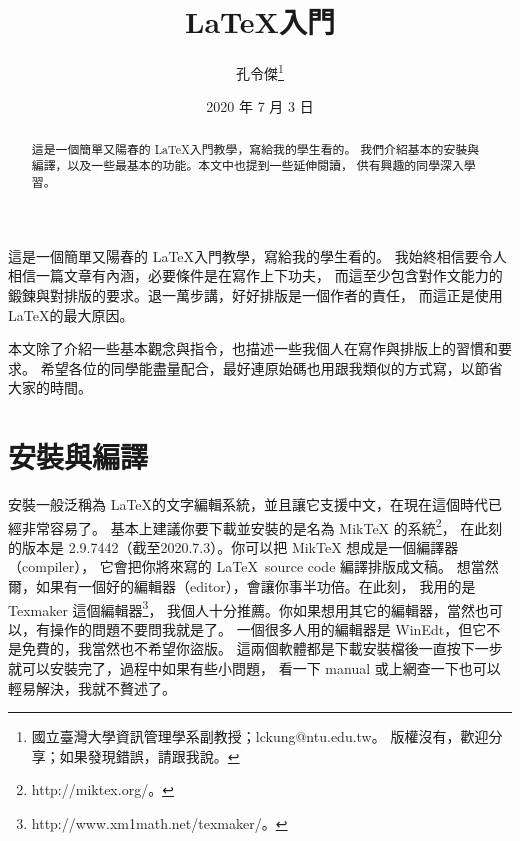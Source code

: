 \documentclass[12pt, a4paper]{article}
\title{\LaTeX 入門}
\author{孔令傑\thanks{國立臺灣大學資訊管理學系副教授；lckung@ntu.edu.tw。
	版權沒有，歡迎分享；如果發現錯誤，請跟我說。}}
\date{2020 年 7 月 3 日}
\begin{document}
\maketitle






\begin{abstract}
\hspace{1pt} 這是一個簡單又陽春的 \LaTeX 入門教學，寫給我的學生看的。
我們介紹基本的安裝與編譯，以及一些最基本的功能。本文中也提到一些延伸閱讀，
供有興趣的同學深入學習。
\end{abstract}










這是一個簡單又陽春的 \LaTeX 入門教學，寫給我的學生看的。
我始終相信要令人相信一篇文章有內涵，必要條件是在寫作上下功夫，
而這至少包含對作文能力的鍛鍊與對排版的要求。退一萬步講，好好排版是一個作者的責任，
而這正是使用 \LaTeX 的最大原因。

本文除了介紹一些基本觀念與指令，也描述一些我個人在寫作與排版上的習慣和要求。
希望各位的同學能盡量配合，最好連原始碼也用跟我類似的方式寫，以節省大家的時間。











\section{安裝與編譯}

安裝一般泛稱為 \LaTeX 的文字編輯系統，並且讓它支援中文，在現在這個時代已經非常容易了。
基本上建議你要下載並安裝的是名為 MikTeX 的系統\footnote{http://miktex.org/。}，
在此刻的版本是 2.9.7442（截至2020.7.3）。你可以把 MikTeX 想成是一個編譯器（compiler），
它會把你將來寫的 \LaTeX \ source code 編譯排版成文稿。
想當然爾，如果有一個好的編輯器（editor），會讓你事半功倍。在此刻，
我用的是 Texmaker 這個編輯器\footnote{http://www.xm1math.net/texmaker/。}，
我個人十分推薦。你如果想用其它的編輯器，當然也可以，有操作的問題不要問我就是了。
一個很多人用的編輯器是 WinEdt，但它不是免費的，我當然也不希望你盜版。
這兩個軟體都是下載安裝檔後一直按下一步就可以安裝完了，過程中如果有些小問題，
看一下 manual 或上網查一下也可以輕易解決，我就不贅述了。
\end{document}
